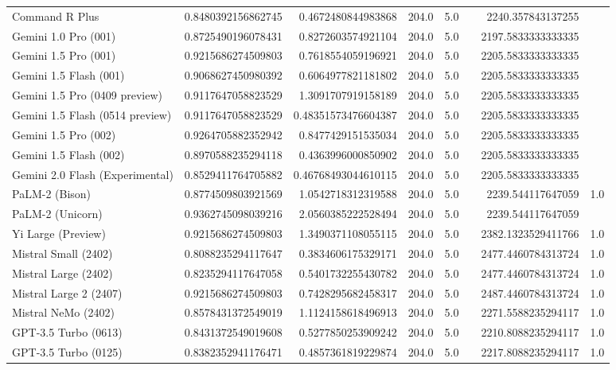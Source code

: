 \begin{table}[htp]
{\begin{tabular}{lrrrrrrr}
Command R Plus & 0.8480392156862745 & 0.4672480844983868 & 204.0 & 5.0 &  & 2240.357843137255 &  \\
Gemini 1.0 Pro (001) & 0.8725490196078431 & 0.8272603574921104 & 204.0 & 5.0 &  & 2197.5833333333335 &  \\
Gemini 1.5 Pro (001) & 0.9215686274509803 & 0.7618554059196921 & 204.0 & 5.0 &  & 2205.5833333333335 &  \\
Gemini 1.5 Flash (001) & 0.9068627450980392 & 0.6064977821181802 & 204.0 & 5.0 &  & 2205.5833333333335 &  \\
Gemini 1.5 Pro (0409 preview) & 0.9117647058823529 & 1.3091707919158189 & 204.0 & 5.0 &  & 2205.5833333333335 &  \\
Gemini 1.5 Flash (0514 preview) & 0.9117647058823529 & 0.48351573476604387 & 204.0 & 5.0 &  & 2205.5833333333335 &  \\
Gemini 1.5 Pro (002) & 0.9264705882352942 & 0.8477429151535034 & 204.0 & 5.0 &  & 2205.5833333333335 &  \\
Gemini 1.5 Flash (002) & 0.8970588235294118 & 0.4363996000850902 & 204.0 & 5.0 &  & 2205.5833333333335 &  \\
Gemini 2.0 Flash (Experimental) & 0.8529411764705882 & 0.46768493044610115 & 204.0 & 5.0 &  & 2205.5833333333335 &  \\
PaLM-2 (Bison) & 0.8774509803921569 & 1.0542718312319588 & 204.0 & 5.0 &  & 2239.544117647059 & 1.0 \\
PaLM-2 (Unicorn) & 0.9362745098039216 & 2.0560385222528494 & 204.0 & 5.0 &  & 2239.544117647059 &  \\
Yi Large (Preview) & 0.9215686274509803 & 1.3490371108055115 & 204.0 & 5.0 &  & 2382.1323529411766 & 1.0 \\
Mistral Small (2402) & 0.8088235294117647 & 0.3834606175329171 & 204.0 & 5.0 &  & 2477.4460784313724 & 1.0 \\
Mistral Large (2402) & 0.8235294117647058 & 0.5401732255430782 & 204.0 & 5.0 &  & 2477.4460784313724 & 1.0 \\
Mistral Large 2 (2407) & 0.9215686274509803 & 0.7428295682458317 & 204.0 & 5.0 &  & 2487.4460784313724 & 1.0 \\
Mistral NeMo (2402) & 0.8578431372549019 & 1.1124158618496913 & 204.0 & 5.0 &  & 2271.5588235294117 & 1.0 \\
GPT-3.5 Turbo (0613) & 0.8431372549019608 & 0.5277850253909242 & 204.0 & 5.0 &  & 2210.8088235294117 & 1.0 \\
GPT-3.5 Turbo (0125) & 0.8382352941176471 & 0.4857361819229874 & 204.0 & 5.0 &  & 2217.8088235294117 & 1.0 \\

\end{tabular}}
\end{table}
